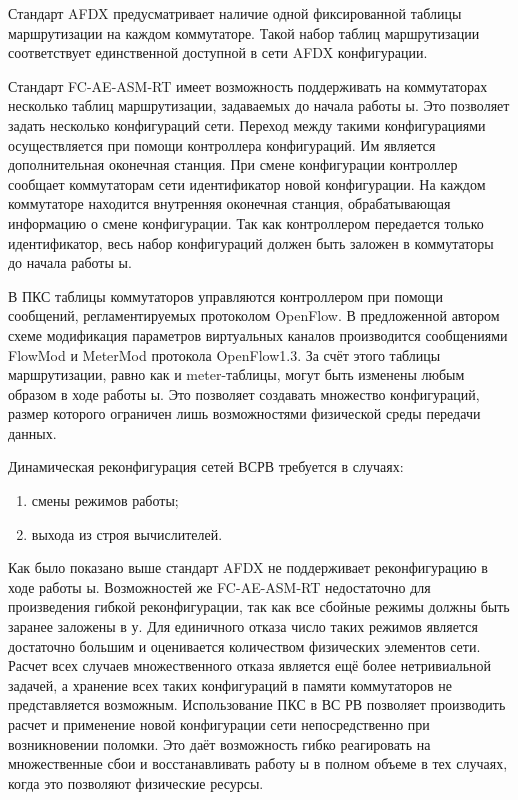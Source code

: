 \documentclass[12pt,fleqn]{article}
\begin{document}
Стандарт AFDX предусматривает наличие одной фиксированной таблицы маршрутизации на каждом коммутаторе. Такой набор таблиц маршрутизации соответствует единственной доступной в сети AFDX конфигурации.

Стандарт FC-AE-ASM-RT имеет возможность поддерживать на коммутаторах несколько таблиц маршрутизации, задаваемых до начала работы ы. Это позволяет задать несколько конфигураций сети. Переход между такими конфигурациями осуществляется при помощи контроллера конфигураций. Им является дополнительная оконечная станция. При смене конфигурации контроллер сообщает коммутаторам сети идентификатор новой конфигурации. На каждом коммутаторе находится внутренняя оконечная станция, обрабатывающая информацию о смене конфигурации. Так как контроллером передается только идентификатор, весь набор конфигураций должен быть заложен в коммутаторы до начала работы ы.

В ПКС таблицы коммутаторов управляются контроллером при помощи сообщений, регламентируемых протоколом OpenFlow. В предложенной автором схеме модификация параметров виртуальных каналов производится сообщениями FlowMod и MeterMod протокола OpenFlow1.3. За счёт этого таблицы маршрутизации, равно как и meter-таблицы, могут быть изменены любым образом в ходе работы ы. Это позволяет создавать множество конфигураций, размер которого ограничен лишь возможностями физической среды передачи данных.

Динамическая реконфигурация сетей ВСРВ требуется в случаях:
\begin{enumerate}
	\item смены режимов работы;
	\item выхода из строя вычислителей.
\end{enumerate}

Как было показано выше стандарт AFDX не поддерживает реконфигурацию в ходе работы ы. Возможностей же FC-AE-ASM-RT недостаточно для произведения гибкой реконфигурации, так как все сбойные режимы должны быть заранее заложены в у. Для единичного отказа число таких режимов является достаточно большим и оценивается количеством физических элементов сети. Расчет всех случаев множественного отказа является ещё более нетривиальной задачей, а хранение всех таких конфигураций в памяти коммутаторов не представляется возможным. Использование ПКС в ВС РВ позволяет производить расчет и применение новой конфигурации сети непосредственно при возникновении поломки. Это даёт возможность гибко реагировать на множественные сбои и восстанавливать работу ы в полном объеме в тех случаях, когда это позволяют физические ресурсы.
\end{document}
